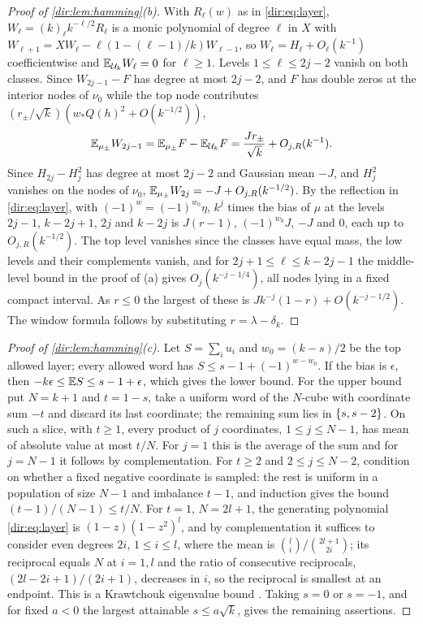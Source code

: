 \begin{proof}[Proof of \cref{dir:lem:hamming}\textup{(b)}]
With $R_\ell(w)$ as in \eqref{dir:eq:layer}, $W_\ell=(k)_\ell k^{-\ell/2}R_\ell$ is a monic polynomial of degree
$\ell$ in $X$ with $W_{\ell+1}=XW_\ell-\ell(1-(\ell-1)/k)W_{\ell-1}$, so $W_\ell=H_\ell+O_\ell(k^{-1})$
coefficientwise and $\mathbb{E}_{\mathcal U_k}W_\ell=0$ for $\ell\ge1$. Levels $1\le\ell\le2j-2$ vanish on both
classes. Since $W_{2j-1}-F$ has degree at most $2j-2$, and $F$ has double zeros at the interior nodes of
$\nu_0$ while the top node contributes $(r_\pm/\sqrt k)(w_*Q(h)^2+O(k^{-1/2}))$,
\[
 \mathbb{E}_{\mu_\pm}W_{2j-1}=\mathbb{E}_{\mu_\pm}F-\mathbb{E}_{\mathcal U_k}F=\frac{Jr_\pm}{\sqrt k}+O_{j,R}(k^{-1}).
\]
Since $H_{2j}-H_j^2$ has degree at most $2j-2$ and Gaussian mean $-J$, and $H_j^2$ vanishes on the nodes
of $\nu_0$, $\mathbb{E}_{\mu_\pm}W_{2j}=-J+O_{j,R}(k^{-1/2})$. By the reflection in \eqref{dir:eq:layer}, with
$(-1)^w=(-1)^{w_0}\eta$, $k^j$ times the bias of $\mu$ at the levels $2j-1$, $k-2j+1$, $2j$ and $k-2j$ is
$J(r-1)$, $(-1)^{w_0}J$, $-J$ and $0$, each up to $O_{j,R}(k^{-1/2})$. The top level vanishes since the
classes have equal mass, the low levels and their complements vanish, and for
$2j+1\le\ell\le k-2j-1$ the middle-level bound in the proof of (a) gives $O_j(k^{-j-1/4})$, all nodes lying
in a fixed compact interval. As $r\le0$ the largest of these is $Jk^{-j}(1-r)+O(k^{-j-1/2})$. The window
formula follows by substituting $r=\lambda-\delta_k$.
\end{proof}

\begin{proof}[Proof of \cref{dir:lem:hamming}\textup{(c)}]
Let $S=\sum_iu_i$ and $w_0=(k-s)/2$ be the top allowed layer; every allowed word has
$S\le s-1+(-1)^{w-w_0}$. If the bias is $\epsilon$, then $-k\epsilon\le\mathbb{E} S\le s-1+\epsilon$,
which gives the lower bound. For the upper bound put $N=k+1$ and $t=1-s$, take a uniform word of
the $N$-cube with coordinate sum $-t$ and discard its last coordinate; the remaining sum lies in
$\{s,s-2\}$. On such a slice, with $t\ge1$, every product of $j$ coordinates, $1\le j\le N-1$,
has mean of absolute value at most $t/N$. For $j=1$ this is the average of the sum and for
$j=N-1$ it follows by complementation. For $t\ge2$ and $2\le j\le N-2$, condition on whether a
fixed negative coordinate is sampled: the rest is uniform in a population of size $N-1$ and
imbalance $t-1$, and induction gives the bound $(t-1)/(N-1)\le t/N$. For $t=1$, $N=2l+1$, the
generating polynomial \eqref{dir:eq:layer} is $(1-z)(1-z^2)^l$, and by complementation it
suffices to consider even degrees $2i$, $1\le i\le l$, where the mean is
$\binom li/\binom{2l+1}{2i}$; its reciprocal equals $N$ at $i=1,l$ and the ratio of consecutive
reciprocals, $(2l-2i+1)/(2i+1)$, decreases in $i$, so the reciprocal is smallest at an endpoint.
This is a Krawtchouk eigenvalue bound \cite[Theorem~1.2(i)]{BrouwerCioabaIhringerMcGinnis2017Smallest}.
Taking $s=0$ or $s=-1$, and for fixed $a<0$ the largest attainable $s\le a\sqrt k$, gives the
remaining assertions.
\end{proof}

